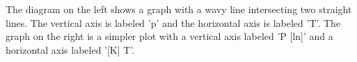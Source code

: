 The diagram on the left shows a graph with a wavy line intersecting two straight lines. The vertical axis is labeled 'p' and the horizontal axis is labeled 'T'. The graph on the right is a simpler plot with a vertical axis labeled 'P [ln]' and a horizontal axis labeled '[K] T'.